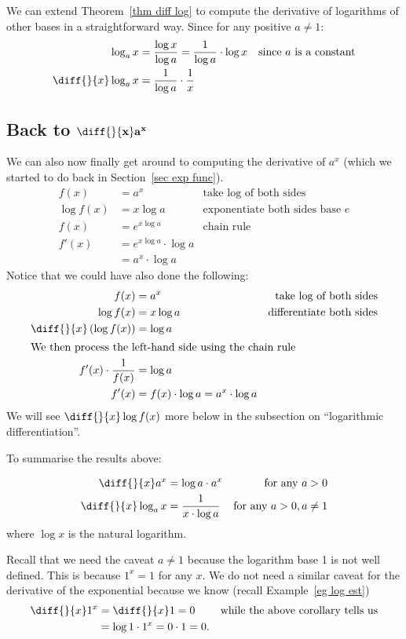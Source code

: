 We can extend Theorem~\ref{thm diff log} to compute the derivative of
logarithms of other bases in a straightforward way. Since for any positive $a
\neq 1$:
\begin{align*}
  \log_a x &= \frac{\log x}{\log a} = \frac{1}{\log a} \cdot \log x &
\text{since $a$ is a constant}\\
  \diff{}{x} \log_a x &= \frac{1}{\log a} \cdot \frac{1}{x}
\end{align*}

\subsection*{Back to $\mathbf{\diff{}{x} a^x}$}

We can also now finally get around to computing the derivative of $a^x$ (which
we started to do back in Section~\ref{sec exp func}).
\begin{align*}
  f(x) &= a^x & \text{take log of both sides}\\
  \log f(x) &= x \log a & \text{exponentiate both sides base $e$}\\
  f(x) &= e^{x \log a} & \text{chain rule}\\
  f'(x) &= e^{x \log a} \cdot \log a \\
  &= a^x \cdot \log a
\end{align*}
Notice that we could have also done the following:
\begin{align*}
  f(x) &= a^x & \text{take log of both sides} \\
  \log f(x) &= x \log a & \text{differentiate both sides}\\
  \diff{}{x} \left( \log f(x) \right) &=
\log a \\
\intertext{We then process the left-hand side using the chain rule}
  f'(x) \cdot \frac{1}{f(x)} &= \log a \\
  f'(x) &= f(x) \cdot \log a = a^x \cdot \log a
\end{align*}
We will see $\diff{}{x} \log f(x)$ more below in the subsection on
``logarithmic differentiation''.

To summarise the results above:
\begin{cor}\label{cor_2_10}
\begin{align*}
  \diff{}{x} a^x &= \log a \cdot a^x & \text{for any $a>0$}\\
  \diff{}{x} \log_a x &= \frac{1}{x \cdot \log a} & \text{for any $a>0,
a \neq 1$}
\end{align*}
where $\log x$ is the natural logarithm.
\end{cor}
Recall that we need the caveat $a \neq 1$ because the logarithm base 1 is not
well defined. This is because $1^x = 1$ for any $x$. We do not need a similar
caveat for the derivative of the exponential because we know (recall
Example~\ref{eg log est})
\begin{align*}
  \diff{}{x} 1^x &= \diff{}{x} 1= 0 &\text{while the above corollary tells us}\\
  &= \log 1 \cdot 1^x = 0 \cdot 1 = 0.
\end{align*}


